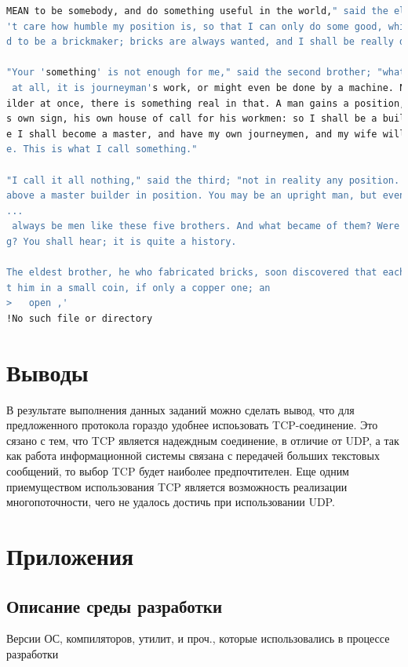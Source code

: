 \documentclass[12pt,a4paper]{report}
\begin{document}
\begin{lstlisting}[language=sh]
MEAN to be somebody, and do something useful in the world," said the eldest of five brothers. "I don
't care how humble my position is, so that I can only do some good, which will be something. I inten
d to be a brickmaker; bricks are always wanted, and I shall be really doing something."

"Your 'something' is not enough for me," said the second brother; "what you talk of doing is nothing
 at all, it is journeyman's work, or might even be done by a machine. No! I should prefer to be a bu
ilder at once, there is something real in that. A man gains a position, he becomes a citizen, has hi
s own sign, his own house of call for his workmen: so I shall be a builder. If all goes well, in tim
e I shall become a master, and have my own journeymen, and my wife will be treated as a master's wif
e. This is what I call something."

"I call it all nothing," said the third; "not in reality any position. There are many in a town far
above a master builder in position. You may be an upright man, but even as a master you will only be
...
 always be men like these five brothers. And what became of them? Were they each nothing or somethin
g? You shall hear; it is quite a history.

The eldest brother, he who fabricated bricks, soon discovered that each brick, when finished, brough
t him in a small coin, if only a copper one; an
>   open ,'
!No such file or directory
\end{lstlisting}
\chapter{Выводы}
В результате выполнения данных заданий можно сделать вывод, что для предложенного протокола гораздо удобнее испоьзовать TCP-соединение. Это сязано с тем, что TCP является надеждным соединение, в отличие от UDP, а так как работа информационной системы связана с передачей больших текстовых сообщений, то выбор TCP будет наиболее предпочтителен. Еще одним приемуществом использования TCP является возможность реализации многопоточности, чего не удалось достичь при использовании UDP.

\chapter*{Приложения}
\section*{Описание среды разработки}
Версии ОС, компиляторов, утилит, и проч., которые использовались в процессе разработки
\end{document}
